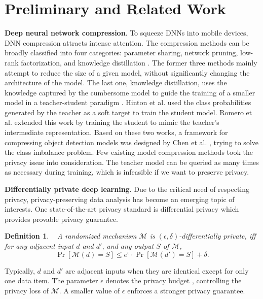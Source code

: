\documentclass[letterpaper]{article} %
\newtheorem{definition}{Definition}
\begin{document}
\section{Preliminary and Related Work}
\textbf{Deep neural network compression}. To squeeze DNNs into mobile devices, DNN compression attracts intense attention. The compression methods can be broadly classified into four categories: parameter sharing, network pruning, low-rank factorization, and knowledge distillation \cite{han2015deep,howard2017mobile,cheng2018learning}. The former three methods mainly attempt to reduce the size of a given model, without significantly changing the architecture of the model. The last one, knowledge distillation, uses the knowledge captured by the cumbersome model to guide the training of a smaller model in a teacher-student paradigm \cite{bucila2006model}. Hinton et al. \cite{hinton2015distilling} used the class probabilities generated by the teacher as a soft target to train the student model. Romero et al. \cite{romero2015fitnets} extended this work by training the student to mimic the teacher's intermediate representation. Based on these two works, a framework for compressing object detection models was designed by Chen et al. \cite{cheng2018learning}, trying to solve the class imbalance problem. Few existing model compression methods took the privacy issue into consideration. The teacher model can be queried as many times as necessary during training, which is infeasible if we want to preserve privacy.

\textbf{Differentially private deep learning}. Due to the critical need of respecting privacy, privacy-preserving data analysis has become an emerging topic of interests. One state-of-the-art privacy standard is differential privacy \cite{dwork2011diff} which provides provable privacy guarantee. 

\begin{definition}~\cite{dwork2011diff}
  A randomized mechanism $\mathcal{M}$ is $(\epsilon,\delta)$-differentially private, iff for any adjacent input $d$ and $d'$, and any output $S$ of $\mathcal{M}$,
  \begin{equation}
    \Pr [\mathcal{M} (d) = S] \le {e^\epsilon } \cdot \Pr [\mathcal{M} (d') = S]+\delta. 
  \end{equation}
\end{definition}

Typically, $d$ and $d'$ are adjacent inputs when they are identical except for only one data item. The parameter $\epsilon$ denotes the privacy budget \cite{dwork2011diff}, controlling the privacy loss of $\mathcal{M}$. A smaller value of $\epsilon$ enforces a stronger privacy guarantee.
\end{document}
